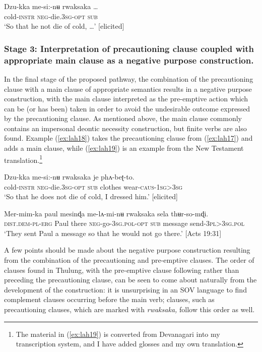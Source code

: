 \documentclass[output=paper,colorlinks,citecolor=brown,
]{langscibook}
\begin{document}
\ea \label{ex:lah17}
\gll Dzu-kka me-si:-nʉ rwaksaka \ldots \\
cold-\textsc{instr} \textsc{neg}-die.\textsc{3sg-opt} \textsc{sub} \\
\glt `So that he not die of cold, \ldots' [elicited]
\z

\subsubsection{Stage 3: Interpretation of precautioning clause coupled with appropriate main clause as a negative purpose construction.}
\label{subsubsec:stage3}

In the final stage of the proposed pathway, the combination of the precautioning clause with a main clause of appropriate semantics results in a negative purpose construction, with the main clause interpreted as the pre-emptive action which can be (or has been) taken in order to avoid the undesirable outcome expressed by the precautioning clause. As mentioned above, the main clause commonly contains an impersonal deontic necessity construction, but finite verbs are also found. Example (\ref{ex:lah18}) takes the precautioning clause from (\ref{ex:lah17}) and adds a main clause, while (\ref{ex:lah19}) is an example from the New Testament translation.\footnote{The material in (\ref{ex:lah19}) is converted from Devanagari into my transcription system, and I have added glosses and my own translation.}


\ea \label{ex:lah18}
\gll Dzu-kka me-si:-nʉ rwaksaka je phʌ-beʈ-to. \\
cold-\textsc{instr} \textsc{neg}-die.\textsc{3sg-opt} \textsc{sub} clothes wear-\textsc{caus-1sg>3sg} \\
\glt `So that he does not die of cold, I dressed him.' [elicited]
\z

   
\ea \label{ex:lah19}
\gll Mer-mim-ka paul mesinɖa me-lʌ-mi-nʉ rwaksaka sela  thʉr-so-mɖi. \\
\textsc{dist.dem-pl-erg} Paul there \textsc{neg-}go-\textsc{3sg.pol-opt} \textsc{sub} message send\textsc{-3pl>3sg.pol} \\
\glt `They sent Paul a message so that he would not go there.' [Acts 19:31]
\z

A few points should be made about the negative purpose construction resulting from the combination of the precautioning and pre-emptive clauses. The order of clauses found in Thulung, with the pre-emptive clause following rather than preceding the precautioning clause, can be seen to come about naturally from the development of the construction: it is unsurprising in an SOV language to find complement clauses occurring before the main verb; clauses, such as precautioning clauses, which are marked with \textit{rwaksaka,} follow this order as well.
\end{document}
